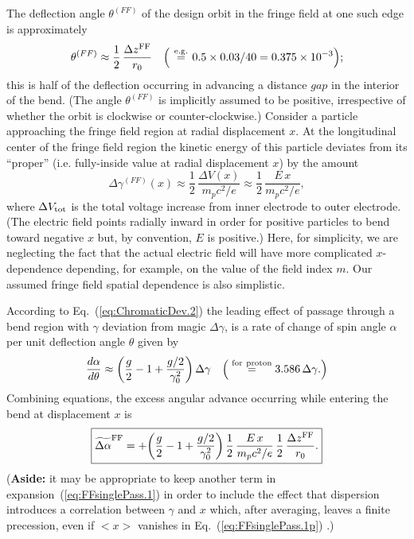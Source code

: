 \documentclass[]{article}
\begin{document}
The deflection angle $\theta^{(FF)}$ of the design orbit in
the fringe field at one such edge is approximately
%
\begin{equation}
\theta^{(FF)}
 \approx
\frac{1}{2}\,
\frac{\Delta z^{\rm FF}}{r_0}
\quad
\Big(
\overset{\rm e.g.}{\ =\ }
0.5\times0.03/40
 =
0.375\times10^{-3}
\Big);
\label{eq:FF.1}
\end{equation}
%
this is half of the deflection occurring in advancing a
distance $gap$ in the interior of the bend. (The angle $\theta^{(FF)}$ 
is implicitly assumed to be positive, irrespective of whether the
orbit is clockwise or counter-clockwise.)
Consider a particle approaching the fringe field region
at radial displacement $x$. At the longitudinal center of the fringe field
region the kinetic energy of this particle deviates
from its ``proper'' (i.e. fully-inside value at radial displacement $x$)
by the amount
%
\begin{equation}
\Delta\gamma^{(FF)}(x)
 \approx
\frac{1}{2}\,
\frac{\Delta V(x)}{m_pc^2/e}
 \approx
\frac{1}{2}\,
\frac{E\,x}{m_pc^2/e},
\label{eq:FF.2}
\end{equation}
%
where $\Delta V_{\rm tot}$ is the total voltage 
increase from inner electrode to outer electrode.
(The electric 
field points radially inward in order for
positive particles to bend toward negative $x$
but, by convention, $E$ is positive.)
Here, for simplicity, we are neglecting the
fact that the actual electric field will have
more complicated $x$-dependence depending,
for example, on the value of the field index $m$. 
Our assumed fringe field spatial dependence is also 
simplistic.

According to Eq.~(\ref{eq:ChromaticDev.2}) the
leading effect of passage through a bend region
with $\gamma$ deviation from magic $\Delta\gamma$,
is a rate of change of spin angle $\alpha$ per
unit deflection angle $\theta$ given by
%
\begin{equation}
\frac{d\alpha}{d\theta}
 \approx
\bigg(\frac{g}{2} - 1 + \frac{g/2}{\gamma_0^2}\bigg)\,\Delta\gamma
\quad
\Big( \overset{\rm for\ proton}{\quad=\quad}
3.586\,\Delta\gamma.
\Big)
\label{eq:FFsinglePass.1}
\end{equation}
%
Combining equations, the excess angular advance occurring
while entering the bend at displacement $x$ is 
%
\begin{equation}
\boxed{
\widetilde{\Delta\alpha}^{\rm FF}
 =
+\bigg(\frac{g}{2} - 1 + \frac{g/2}{\gamma_0^2}\bigg)\,
\frac{1}{2}\,
\frac{E\,x}{m_pc^2/e}\,
\frac{1}{2}\,
\frac{\Delta z^{\rm FF}}{r_0}.
\label{eq:FFsinglePass.1p}
}
\end{equation}
%
({\bf Aside:} it may be appropriate to keep another term in
expansion~(\ref{eq:FFsinglePass.1}) in order to include
the effect that dispersion introduces a correlation between
$\gamma$ and $x$ which, after averaging, leaves a finite
precession, even if $<x>$ vanishes
in Eq.~(\ref{eq:FFsinglePass.1p}) .)
\end{document}
